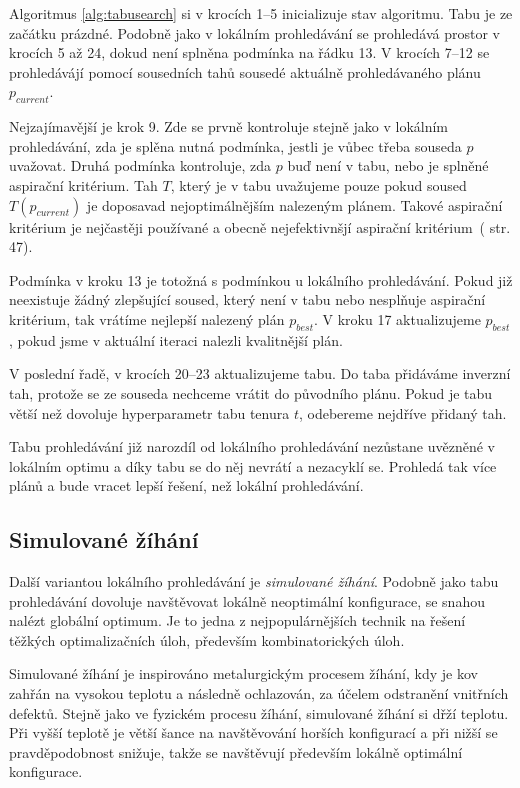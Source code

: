 Algoritmus \ref{alg:tabusearch} si v krocích 1--5 inicializuje stav algoritmu. Tabu je ze začátku prázdné.
Podobně jako v lokálním prohledávání se prohledává prostor v krocích 5 až 24, dokud není splněna podmínka na řádku 13.
V krocích 7--12 se prohledávájí pomocí sousedních tahů sousedé aktuálně prohledávaného plánu $p_{current}$. 

Nejzajímavější je krok 9. Zde se prvně kontroluje stejně jako v lokálním prohledávání, zda je splěna nutná podmínka, jestli je vůbec třeba souseda $p$ uvažovat.
Druhá podmínka kontroluje, zda $p$ buď není v tabu, nebo je splněné aspirační kritérium.
Tah $T$, který je v tabu uvažujeme pouze pokud soused $T(p_{current})$ je doposavad nejoptimálnějším nalezeným plánem.
Takové aspirační kritérium je nejčastěji používané a obecně nejefektivnšjí aspirační kritérium~(\cite{GlovKoch03} str. 47).

Podmínka v kroku 13 je totožná s podmínkou u lokálního prohledávání.
Pokud již neexistuje žádný zlepšující soused, který není v tabu nebo nesplňuje aspirační kritérium, tak vrátíme nejlepší nalezený plán $p_{best}$.
V kroku 17 aktualizujeme $p_{best}$, pokud jsme v aktuální iteraci nalezli kvalitnější plán.

V poslední řadě, v krocích 20--23 aktualizujeme tabu.
Do taba přidáváme inverzní tah, protože se ze souseda nechceme vrátit do původního plánu.
Pokud je tabu větší než dovoluje hyperparametr tabu tenura $t$, odebereme nejdříve přidaný tah.

Tabu prohledávání již narozdíl od lokálního prohledávání nezůstane uvězněné v lokálním optimu a díky tabu se do něj nevrátí a nezacyklí se.
Prohledá tak více plánů a bude vracet lepší řešení, než lokální prohledávání.

\subsection{Simulované žíhání}

Další variantou lokálního prohledávání je \textit{simulované žíhání}.
Podobně jako tabu prohledávání dovoluje navštěvovat lokálně neoptimální konfigurace, se snahou nalézt globální optimum.
Je to jedna z nejpopulárnějších technik na řešení těžkých optimalizačních úloh, především kombinatorických úloh.

Simulované žíhání je inspirováno metalurgickým procesem žíhání, kdy je kov zahřán na vysokou teplotu
a následně ochlazován, za účelem odstranění vnitřních defektů.
Stejně jako ve fyzickém procesu žíhání, simulované žíhání si dřží teplotu.
Při vyšší teplotě je větší šance na navštěvování horších konfigurací a při nižší se pravděpodobnost snižuje, takže se navštěvují především lokálně optimální konfigurace.

